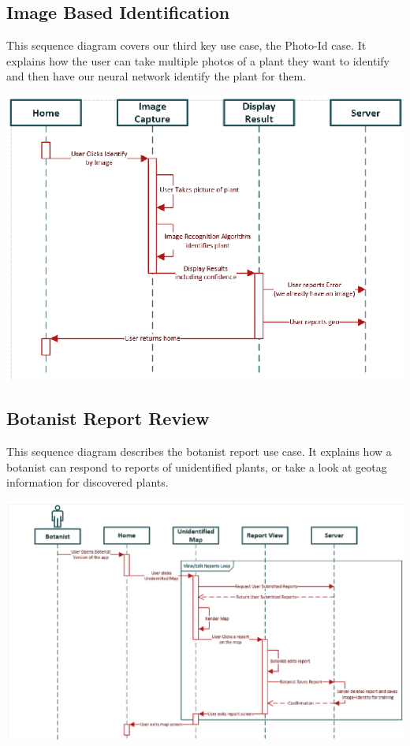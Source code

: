 \documentclass[a4paper]{article}
\begin{document}
\subsection{Image Based Identification}
This sequence diagram covers our third key use case, the Photo-Id case. It explains how the user can take multiple photos of a plant they want to identify and then have our neural network identify the plant for them.
\begin{center}\includegraphics[scale=1.2]{ImageIdentification.eps}\end{center}
\pagebreak
\subsection{Botanist Report Review}
This sequence diagram describes the botanist report use case. It explains how a botanist can respond to reports of unidentified plants, or take a look at geotag information for discovered plants.
\begin{center}\includegraphics[scale=.8]{BotanistWorkflow.eps}\end{center}
\pagebreak
\end{document}

